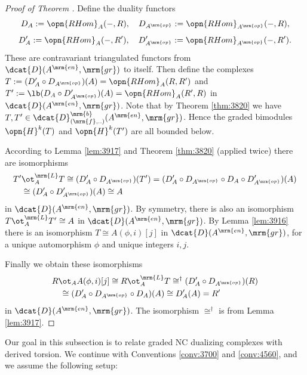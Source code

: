 \begin{proof}[Proof of Theorem \tup{\ref{thm:3780}}]
Define the duality functors 
\[ D_A := \opn{RHom}_A(-, R) , \quad 
D_{A^{\mrm{op}}} := \opn{RHom}_{A^{\mrm{op}}}(-, R) , \]
\[ D'_A := \opn{RHom}_A(-, R') , \quad 
D'_{A^{\mrm{op}}} := \opn{RHom}_{A^{\mrm{op}}}(-, R') . \]
These are contravariant triangulated functors from 
$\dcat{D}(A^{\mrm{en}}, \mrm{gr})$ to itself. 
Then define the complexes 
$T := (D'_A \circ D_{A^{\mrm{op}}})(A) = \opn{RHom}_{A}(R, R')$
and 
$T' := \lb (D_A \circ D'_{A^{\mrm{op}}})(A) = \opn{RHom}_{A}(R', R)$
in $\dcat{D}(A^{\mrm{en}}, \mrm{gr})$. 
Note that by Theorem \ref{thm:3820} we have 
$T, T' \in \dcat{D}^{\mrm{b}}_{(\mrm{f}, ..)}(A^{\mrm{en}}, \mrm{gr})$.
Hence the graded bimodules $\opn{H}^k(T)$ and $\opn{H}^k(T')$ are all bounded 
below. 

According to Lemma \ref{lem:3917} and Theorem \ref{thm:3820} (applied twice) 
there are isomorphisms 
\[ \begin{aligned}
& T' \ot^{\mrm{L}}_{A} T \cong (D'_A \circ D_{A^{\mrm{op}}})(T') = 
(D'_A \circ D_{A^{\mrm{op}}} \circ D_A \circ D'_{A^{\mrm{op}}})(A) 
\\ & \quad 
\cong (D'_A \circ D'_{A^{\mrm{op}}})(A) \cong A 
\end{aligned} \]
in $\dcat{D}(A^{\mrm{en}}, \mrm{gr})$. 
By symmetry, there is also an isomorphism 
$T \ot^{\mrm{L}}_{A} T' \cong A$ 
in $\dcat{D}(A^{\mrm{en}}, \mrm{gr})$. 
By Lemma \ref{lem:3916} there is an isomorphism
$T \cong A(\phi, i)[j]$
in $\dcat{D}(A^{\mrm{en}}, \mrm{gr})$, for a unique automorphism $\phi$ and 
unique integers $i, j$. 

Finally we obtain these isomorphisms 
\[ \begin{aligned}
& R \ot_A A(\phi, i)[j] \cong 
R \ot^{\mrm{L}}_{A} T \cong^{\dag}
(D'_A \circ D_{A^{\mrm{op}}})(R) 
\\ & \quad 
\cong (D'_A \circ D_{A^{\mrm{op}}} \circ D_A)(A) \cong D'_A(A) = R'
\end{aligned} \]
in $\dcat{D}(A^{\mrm{en}}, \mrm{gr})$.
The isomorphism $\cong^{\dag}$ is from Lemma \ref{lem:3917}. 
\end{proof}






\label{subsec:bal-NCDC-LocDu}

Our goal in this subsection is to relate graded NC dualizing complexes with 
derived torsion. We continue with Conventions \ref{conv:3700} and 
\ref{conv:4560}, and we assume the following setup:

